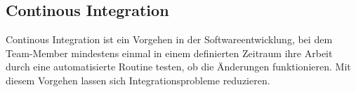 \subsection{Continous Integration}
\label{CI}
Continous Integration ist ein Vorgehen in der Softwareentwicklung, bei dem Team-Member mindestens einmal in einem definierten Zeitraum ihre Arbeit durch eine automatisierte Routine testen, ob die Änderungen funktionieren. Mit diesem Vorgehen lassen sich Integrationsprobleme reduzieren\cite{fowler2006continuous}.